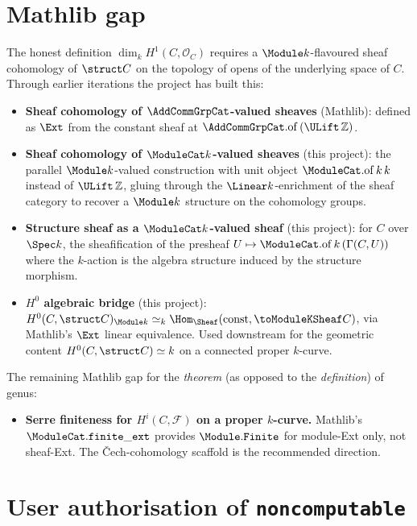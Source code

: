 \section{Mathlib gap}
\label{sec:Genus_status}

The honest definition \(\dim_k H^1(C, \mathcal O_C)\) requires a \(\Module k\)-flavoured sheaf cohomology of \(\struct C\) on the topology of opens of the underlying space of \(C\). Through earlier iterations the project has built this:

\begin{itemize}
  \item \textbf{Sheaf cohomology of \(\AddCommGrpCat\)-valued sheaves} (Mathlib): defined as \(\Ext\) from the constant sheaf at \(\AddCommGrpCat.\mathrm{of}\,(\ULift\,\mathbb Z)\).
  \item \textbf{Sheaf cohomology of \(\ModuleCat k\)-valued sheaves} (this project): the parallel \(\Module k\)-valued construction with unit object \(\ModuleCat.\mathrm{of}\,k\,k\) instead of \(\ULift\,\mathbb Z\), gluing through the \(\Linear k\)-enrichment of the sheaf category to recover a \(\Module k\) structure on the cohomology groups.
  \item \textbf{Structure sheaf as a \(\ModuleCat k\)-valued sheaf} (this project): for \(C\) over \(\Spec k\), the sheafification of the presheaf \(U \mapsto \ModuleCat.\mathrm{of}\,k\,(\Gamma(C, U))\) where the \(k\)-action is the algebra structure induced by the structure morphism.
  \item \textbf{\(H^0\) algebraic bridge} (this project): \(H^0(C, \struct C)_{\Module k} \simeq_k \Hom_{\Sheaf}(\mathrm{const}, \toModuleKSheaf C)\), via Mathlib's \(\Ext\) linear equivalence. Used downstream for the geometric content \(H^0(C, \struct C) \simeq k\) on a connected proper \(k\)-curve.
\end{itemize}

The remaining Mathlib gap for the \emph{theorem} (as opposed to the \emph{definition}) of genus:

\begin{itemize}
  \item \textbf{Serre finiteness for \(H^i(C, \mathcal F)\) on a proper \(k\)-curve.} Mathlib's \(\ModuleCat.\mathtt{finite\_ext}\) provides \(\Module.\mathtt{Finite}\) for module-Ext only, not sheaf-Ext. The Čech-cohomology scaffold is the recommended direction.
\end{itemize}

\section{User authorisation of \texttt{noncomputable}}
\label{sec:Genus_noncomputable}

